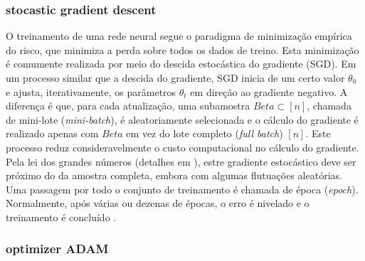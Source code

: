 \documentclass{automatextcc}
\begin{document}


\subsubsection{stocastic gradient descent}
O treinamento de uma rede neural segue o paradigma de minimização empírica do risco, que minimiza a perda sobre todos os dados de treino. Esta minimização é comumente realizada por meio do descida estocástica do gradiente (SGD). Em um processo similar que a descida do gradiente, SGD inicia de um certo valor $\theta_0$ e ajusta, iterativamente, os parâmetros $\theta_t$ em direção ao gradiente negativo. A diferença é que, para cada atualização, uma subamostra $Beta \subset [n]$, chamada de mini-lote (\textit{mini-batch}), é aleatoriamente selecionada e o cálculo do gradiente é realizado apenas com $Beta$ em vez do lote completo (\textit{full batch}) $[n]$. Este processo reduz consideravelmente o custo computacional no cálculo do gradiente. Pela lei dos grandes números (detalhes em \citet{seneta2013}), estre gradiente estocástico deve ser próximo do da amostra completa, embora com algumas flutuações aleatórias. Uma passagem por todo o conjunto de treinamento é chamada de época (\textit{epoch}). Normalmente, após várias ou dezenas de épocas, o erro é nivelado e o treinamento é concluído \citep{fan2021}.


\subsubsection{optimizer ADAM}
\end{document}
